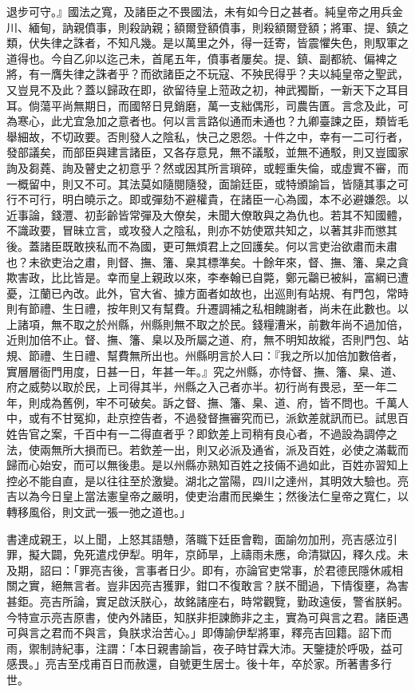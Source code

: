 \begin{pinyinscope}
退步可守。』國法之寬，及諸臣之不畏國法，未有如今日之甚者。純皇帝之用兵金川、緬甸，訥親僨事，則殺訥親；額爾登額僨事，則殺額爾登額；將軍、提、鎮之類，伏失律之誅者，不知凡幾。是以萬里之外，得一廷寄，皆震懼失色，則馭軍之道得也。今自乙卯以迄己未，首尾五年，僨事者屢矣。提、鎮、副都統、偏裨之將，有一膺失律之誅者乎？而欲諸臣之不玩寇、不殃民得乎？夫以純皇帝之聖武，又豈見不及此？蓋以歸政在即，欲留待皇上蒞政之初，神武獨斷，一新天下之耳目耳。倘蕩平尚無期日，而國帑日見銷磨，萬一支絀偶形，司農告匱。言念及此，可為寒心，此尤宜急加之意者也。何以言言路似通而未通也？九卿臺諫之臣，類皆毛舉細故，不切政要。否則發人之陰私，快己之恩怨。十件之中，幸有一二可行者，發部議矣，而部臣與建言諸臣，又各存意見，無不議駁，並無不通駁，則又豈國家詢及芻蕘、詢及瞽史之初意乎？然或因其所言瑣碎，或輕重失倫，或虛實不審，而一概留中，則又不可。其法莫如隨閱隨發，面諭廷臣，或特頒諭旨，皆隨其事之可行不可行，明白曉示之。即或彈劾不避權貴，在諸臣一心為國，本不必避嫌怨。以近事論，錢灃、初彭齡皆常彈及大僚矣，未聞大僚敢與之為仇也。若其不知國體，不識政要，冒昧立言，或攻發人之陰私，則亦不妨使眾共知之，以著其非而懲其後。蓋諸臣既敢挾私而不為國，更可無煩君上之回護矣。何以言吏治欲肅而未肅也？未欲吏治之肅，則督、撫、籓、臬其標準矣。十餘年來，督、撫、籓、臬之貪欺害政，比比皆是。幸而皇上親政以來，李奉翰已自斃，鄭元鸘已被糾，富綱已遭憂，江蘭已內改。此外，官大省、據方面者如故也，出巡則有站規、有門包，常時則有節禮、生日禮，按年則又有幫費。升遷調補之私相餽謝者，尚未在此數也。以上諸項，無不取之於州縣，州縣則無不取之於民。錢糧漕米，前數年尚不過加倍，近則加倍不止。督、撫、籓、臬以及所屬之道、府，無不明知故縱，否則門包、站規、節禮、生日禮、幫費無所出也。州縣明言於人曰：『我之所以加倍加數倍者，實層層衙門用度，日甚一日，年甚一年。』究之州縣，亦恃督、撫、籓、臬、道、府之威勢以取於民，上司得其半，州縣之入己者亦半。初行尚有畏忌，至一年二年，則成為舊例，牢不可破矣。訴之督、撫、籓、臬、道、府，皆不問也。千萬人中，或有不甘冤抑，赴京控告者，不過發督撫審究而已，派欽差就訊而已。試思百姓告官之案，千百中有一二得直者乎？即欽差上司稍有良心者，不過設為調停之法，使兩無所大損而已。若欽差一出，則又必派及通省，派及百姓，必使之滿載而歸而心始安，而可以無後患。是以州縣亦熟知百姓之技倆不過如此，百姓亦習知上控必不能自直，是以往往至於激變。湖北之當陽，四川之達州，其明效大驗也。亮吉以為今日皇上當法憲皇帝之嚴明，使吏治肅而民樂生；然後法仁皇帝之寬仁，以轉移風俗，則文武一張一弛之道也。」

書達成親王，以上聞，上怒其語戇，落職下廷臣會鞫，面諭勿加刑，亮吉感泣引罪，擬大闢，免死遣戍伊犁。明年，京師旱，上禱雨未應，命清獄囚，釋久戍。未及期，詔曰：「罪亮吉後，言事者日少。即有，亦論官吏常事，於君德民隱休戚相關之實，絕無言者。豈非因亮吉獲罪，鉗口不復敢言？朕不聞過，下情復壅，為害甚鉅。亮吉所論，實足啟沃朕心，故銘諸座右，時常觀覽，勤政遠佞，警省朕躬。今特宣示亮吉原書，使內外諸臣，知朕非拒諫飾非之主，實為可與言之君。諸臣遇可與言之君而不與言，負朕求治苦心。」即傳諭伊犁將軍，釋亮吉回籍。詔下而雨，禦制詩紀事，注謂：「本日親書諭旨，夜子時甘霖大沛。天鑒捷於呼吸，益可感畏。」亮吉至戍甫百日而赦還，自號更生居士。後十年，卒於家。所著書多行世。


\end{pinyinscope}

